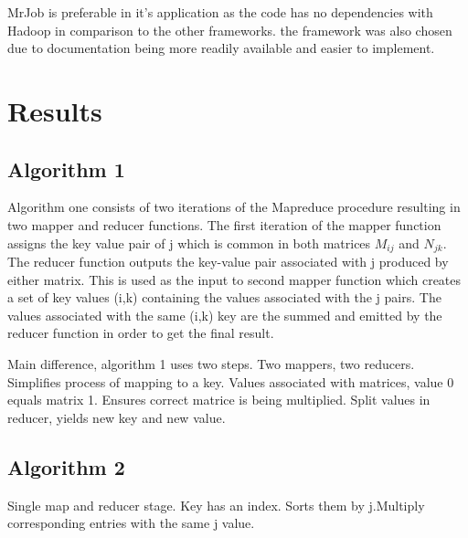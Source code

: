 \documentclass[10pt,twocolumn]{witseiepaper}
\begin{document}
MrJob is preferable in it's application as the code has no dependencies with Hadoop in comparison to the other frameworks. the framework was also chosen due to documentation being more readily available and easier to implement.

\section{Results}

\subsection{Algorithm 1}

Algorithm one consists of two iterations of the Mapreduce procedure resulting in two mapper and reducer functions. The first iteration of the mapper function assigns the key value pair of j which is common in both matrices $M_{ij}$ and $N_{jk}$. The reducer function outputs the key-value pair associated with j produced by either matrix. This is used as the input to second mapper function which creates a set of key values (i,k) containing the values associated with the j pairs. The values associated with the same (i,k) key are the summed and emitted by the reducer function in order to get the final result.

Main difference, algorithm 1 uses two steps. Two mappers, two reducers. Simplifies process of mapping to a key. Values associated with matrices, value 0 equals matrix 1. Ensures correct matrice is being multiplied. Split values in reducer, yields new key and new value.

\subsection{Algorithm 2}

Single map and reducer stage. Key has an index. Sorts them by j.Multiply corresponding entries with the same j value.
\end{document}
